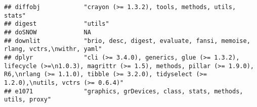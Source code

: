 \documentclass[
]{article}
\begin{document}
\begin{verbatim}
## diffobj            "crayon (>= 1.3.2), tools, methods, utils, stats"                                                                                                                                                                                                                                                                                                                                                                                            
## digest             "utils"                                                                                                                                                                                                                                                                                                                                                                                                                                      
## doSNOW             NA                                                                                                                                                                                                                                                                                                                                                                                                                                           
## downlit            "brio, desc, digest, evaluate, fansi, memoise, rlang, vctrs,\nwithr, yaml"                                                                                                                                                                                                                                                                                                                                                                   
## dplyr              "cli (>= 3.4.0), generics, glue (>= 1.3.2), lifecycle (>=\n1.0.3), magrittr (>= 1.5), methods, pillar (>= 1.9.0), R6,\nrlang (>= 1.1.0), tibble (>= 3.2.0), tidyselect (>= 1.2.0),\nutils, vctrs (>= 0.6.4)"                                                                                                                                                                                                                                 
## e1071              "graphics, grDevices, class, stats, methods, utils, proxy"                                                                                                                                                                                                                                                                                                                                                                                   

\end{verbatim}
\end{document}
